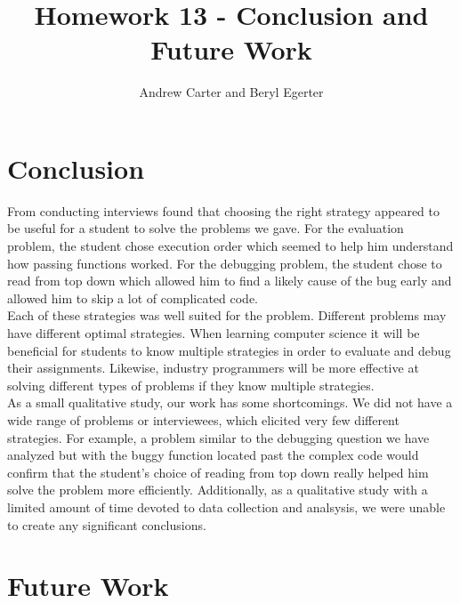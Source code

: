 \documentclass{article}
\title{Homework 13 - Conclusion and Future Work}
\author{Andrew Carter and Beryl Egerter}
\begin{document}
\maketitle
\section{Conclusion}

From conducting interviews found that choosing the right strategy appeared to be useful for a student to solve the problems we gave. 
For the evaluation problem, the student chose execution order which seemed to help him understand how passing functions worked. 
For the debugging problem, the student chose to read from top down which allowed him to find a likely cause of the bug early and allowed him to skip a lot of complicated code.  \\

Each of these strategies was well suited for the problem. 
Different problems may have different optimal strategies. 
When learning computer science it will be beneficial for students to know multiple strategies in order to evaluate and debug their assignments. Likewise, industry programmers will be more effective at solving different types of problems if they know multiple strategies. \\

As a small qualitative study, our work has some shortcomings. We did not have a wide range of problems or interviewees, which elicited very few different strategies. For example, a problem similar to the debugging question we have analyzed but with the buggy function located past the complex code would confirm that the student's choice of reading from top down really helped him solve the problem more efficiently. Additionally, as a qualitative study with a limited amount of time devoted to data collection and analsysis, we were unable to create any significant conclusions. 

\section{Future Work}


\end{document}
